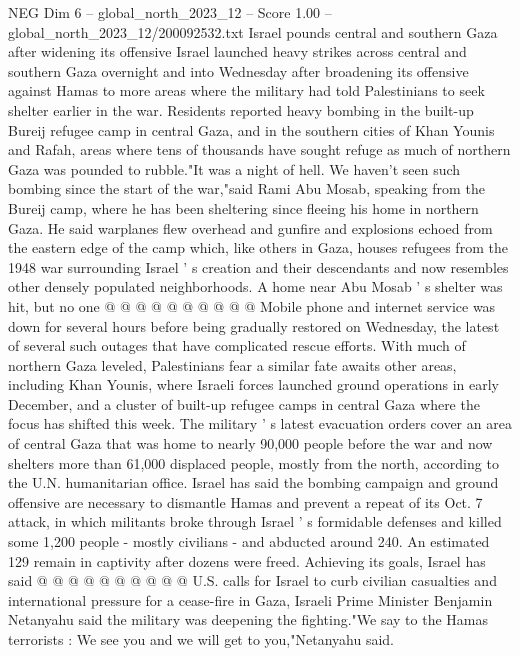 \begin{textsample}{NEG Dim 6 – global\_north\_2023\_12 – Score 1.00 – global\_north\_2023\_12/200092532.txt}  \label{ex:f6_neg_326}
Israel pounds central and southern Gaza after widening its offensive Israel launched heavy strikes across central and southern Gaza overnight and into Wednesday after broadening its offensive against Hamas to more areas where the military had told Palestinians to seek shelter earlier in the war.
Residents reported heavy bombing in the built-up Bureij refugee camp in central Gaza, and in the southern cities of Khan Younis and Rafah, areas where tens of thousands have sought refuge as much of northern Gaza was pounded to rubble."It was a night of hell.
We haven't seen such bombing since the start of the war,"said Rami Abu Mosab, speaking from the Bureij camp, where he has been sheltering since fleeing his home in northern Gaza.
He said warplanes flew overhead and gunfire and explosions echoed from the eastern edge of the camp which, like others in Gaza, houses refugees from the 1948 war surrounding Israel ' s creation and their descendants and now resembles other densely populated neighborhoods.
A home near Abu Mosab ' s shelter was hit, but no one @ @ @ @ @ @ @ @ @ @ Mobile phone and internet service was down for several hours before being gradually restored on Wednesday, the latest of several such outages that have complicated rescue efforts.
With much of northern Gaza leveled, Palestinians fear a similar fate awaits other areas, including Khan Younis, where Israeli forces launched ground operations in early December, and a cluster of built-up refugee camps in central Gaza where the focus has shifted this week.
The military ' s latest evacuation orders cover an area of central Gaza that was home to nearly 90,000 people before the war and now shelters more than 61,000 displaced people, mostly from the north, according to the U.N. humanitarian office.
Israel has said the bombing campaign and ground offensive are necessary to dismantle Hamas and prevent a repeat of its Oct. 7 attack, in which militants broke through Israel ' s formidable defenses and killed some 1,200 people - mostly civilians - and abducted around 240.
An estimated 129 remain in captivity after dozens were freed.
Achieving its goals, Israel has said @ @ @ @ @ @ @ @ @ @ U.S. calls for Israel to curb civilian casualties and international pressure for a cease-fire in Gaza, Israeli Prime Minister Benjamin Netanyahu said the military was deepening the fighting."We say to the Hamas terrorists : We see you and we will get to you,"Netanyahu said.

\end{textsample}
